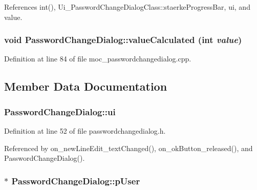 References int(), Ui\_\-PasswordChangeDialogClass::staerkeProgressBar, ui, and value.\hypertarget{class_password_change_dialog_6fbe342d408b5f4250b472f33eeb6c8c}{
\subsubsection[valueCalculated]{\setlength{\rightskip}{0pt plus 5cm}void PasswordChangeDialog::valueCalculated (int {\em value})}}
\label{class_password_change_dialog_6fbe342d408b5f4250b472f33eeb6c8c}




Definition at line 84 of file moc\_\-passwordchangedialog.cpp.

\subsection{Member Data Documentation}
\hypertarget{class_password_change_dialog_cde00bd2d83685f5973bcf304ca100e5}{
\subsubsection[ui]{ {\bf PasswordChangeDialog::ui}}}
\label{class_password_change_dialog_cde00bd2d83685f5973bcf304ca100e5}




Definition at line 52 of file passwordchangedialog.h.

Referenced by on\_\-newLineEdit\_\-textChanged(), on\_\-okButton\_\-released(), and PasswordChangeDialog().\hypertarget{class_password_change_dialog_251ff69dbc17e4169c3457f701683c7b}{
\subsubsection[pUser]{$\ast$ {\bf PasswordChangeDialog::pUser}}}
\label{class_password_change_dialog_251ff69dbc17e4169c3457f701683c7b}





